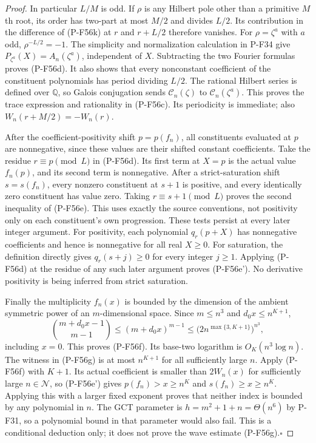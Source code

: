 \begin{proof}
In particular $L/M$ is odd. If $\rho$ is any Hilbert pole
other than a primitive $M$th root, its order has two-part
at most $M/2$ and divides $L/2$. Its contribution in the
difference of (P-F56k) at $r$ and $r+L/2$ therefore
vanishes. For $\rho=\zeta^a$ with $a$ odd,
$\rho^{-L/2}=-1$.
The simplicity and normalization calculation in P-F34 give
$P_{\zeta^a}(X)=A_n(\zeta^a)$, independent of $X$.
Subtracting the two Fourier formulas proves (P-F56d).
It also shows that every nonconstant coefficient of the
constituent polynomials has period dividing $L/2$.
The rational Hilbert series is defined over $\mathbb Q$,
so Galois conjugation sends $\mathcal C_n(\zeta)$ to
$\mathcal C_n(\zeta^a)$. This proves the trace expression
and rationality in (P-F56c). Its periodicity is immediate;
also $W_n(r+M/2)=-W_n(r)$.

After the coefficient-positivity shift $p=p(f_n)$, all
constituents evaluated at $p$ are nonnegative, since these
values are their shifted constant coefficients.
Take the residue $r\equiv p\pmod L$ in (P-F56d).
Its first term at $X=p$ is the actual value $f_n(p)$,
and its second term is nonnegative.
After a strict-saturation shift $s=s(f_n)$, every nonzero
constituent at $s+1$ is positive, and every identically
zero constituent has value zero. Taking
$r\equiv s+1\pmod L$ proves the second inequality of
(P-F56e). This uses exactly the source conventions, not
positivity only on each constituent's own progression.
These tests persist at every later integer argument.
For positivity, each polynomial $q_r(p+X)$ has nonnegative
coefficients and hence is nonnegative for all real $X\ge0$.
For saturation, the definition directly gives
$q_r(s+j)\ge0$ for every integer $j\ge1$.
Applying (P-F56d) at the residue of any such later argument
proves (P-F56e'). No derivative positivity is being inferred
from strict saturation.

Finally the multiplicity $f_n(x)$ is bounded by the
dimension of the ambient symmetric power of an
$m$-dimensional space. Since $m\le n^3$ and
$d_0x\le n^{K+1}$,
\[
 \binom{m+d_0x-1}{m-1}
      \le(m+d_0x)^{m-1}
      \le\bigl(2n^{\max\{3,K+1\}}\bigr)^{n^3},
\]
including $x=0$. This proves (P-F56f).
Its base-two logarithm is $O_K(n^3\log n)$.
The witness in (P-F56g) is at most $n^{K+1}$ for all
sufficiently large $n$. Apply (P-F56f) with $K+1$.
Its actual coefficient is smaller than $2W_n(x)$ for
sufficiently large $n\in\mathcal N$, so (P-F56e') gives
$p(f_n)>x\ge n^K$ and $s(f_n)\ge x\ge n^K$.
Applying this with a larger fixed exponent proves that
neither index is bounded by any polynomial in $n$.
The GCT parameter is $h=m^2+1+n=\Theta(n^6)$ by P-F31,
so a polynomial bound in that parameter would also fail.
This is a conditional deduction only; it does not prove
the wave estimate (P-F56g).\hfill$\square$
\end{proof}

